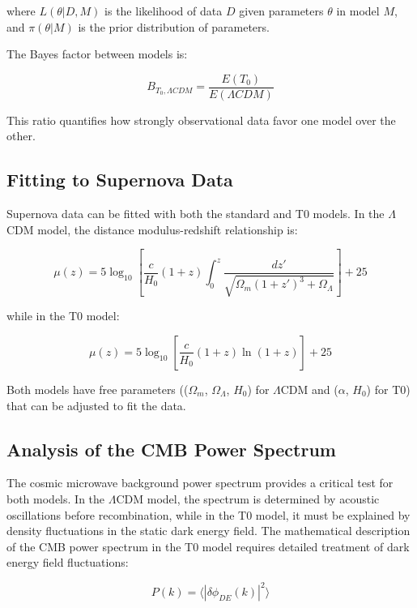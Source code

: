 \documentclass[a4paper,12pt]{article}
\theoremstyle{definition}
\theoremstyle{remark}
\begin{document}
	where $L(\theta|D,M)$ is the likelihood of data $D$ given parameters $\theta$ in model $M$, and $\pi(\theta|M)$ is the prior distribution of parameters.
	
	The Bayes factor between models is:
	
	\begin{equation}
		B_{T_0,\Lambda CDM} = \frac{E(T_0)}{E(\Lambda CDM)}
	\end{equation}
	
	This ratio quantifies how strongly observational data favor one model over the other.
	
	\subsection{Fitting to Supernova Data}
	Supernova data can be fitted with both the standard and T0 models. In the $\Lambda$CDM model, the distance modulus-redshift relationship is:
	
	\begin{equation}
		\mu(z) = 5 \log_{10}\left[\frac{c}{H_0}(1+z)\int_0^z \frac{dz'}{\sqrt{\Omega_m(1+z')^3 + \Omega_{\Lambda}}}\right] + 25
	\end{equation}
	
	while in the T0 model:
	
	\begin{equation}
		\mu(z) = 5 \log_{10}\left[\frac{c}{H_0}(1+z)\ln(1+z)\right] + 25
	\end{equation}
	
	Both models have free parameters (($\Omega_m$, $\Omega_{\Lambda}$, $H_0$) for $\Lambda$CDM and ($\alpha$, $H_0$) for T0) that can be adjusted to fit the data.
	
	\subsection{Analysis of the CMB Power Spectrum}
	The cosmic microwave background power spectrum provides a critical test for both models. In the $\Lambda$CDM model, the spectrum is determined by acoustic oscillations before recombination, while in the T0 model, it must be explained by density fluctuations in the static dark energy field. The mathematical description of the CMB power spectrum in the T0 model requires detailed treatment of dark energy field fluctuations:
	
	\begin{equation}
		P(k) = \langle|\delta\phi_{DE}(k)|^2\rangle
	\end{equation}
	
\end{document}
